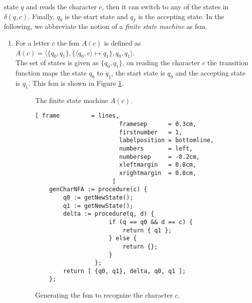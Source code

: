 state $q$ and reads the character $c$, then it can switch to any of the states in
$\delta(q,c)$.
Finally, $q_0$ is the start state and $q_f$ is the accepting state.  In the following, we
abbreviate the notion of a  
\emph{finite state machine} as fsm.
\begin{enumerate}
\item For a letter $c$ the fsm $A(c)$ is defined as
      \\[0.2cm]
      \hspace*{1.3cm}
      $A(c) = \langle \{ q_0, q_1 \}, 
                      \{ \langle q_0, c \rangle \mapsto q_1\}, q_0, q_1  \rangle$.
      \\[0.2cm]
      The set of states is given as $\{ q_0, q_1 \}$, on reading the character $c$ the
      transition function maps the state $q_0$ to $q_1$, the start state is $q_0$ and the
      accepting state is $q_1$.  This fsm is shown in Figure
      \ref{fig:aChar.eps}.

      \begin{figure}[!ht]
        \centering
      \caption{The finite state machine $A(c)$.}
      \label{fig:aChar.eps}
      \end{figure}

      \begin{figure}[!ht]
      \centering
      \begin{Verbatim}[ frame         = lines, 
                        framesep      = 0.3cm, 
                        firstnumber   = 1,
                        labelposition = bottomline,
                        numbers       = left,
                        numbersep     = -0.2cm,
                        xleftmargin   = 0.8cm,
                        xrightmargin  = 0.8cm,
                      ]
    genCharNFA := procedure(c) {
        q0 := getNewState();
        q1 := getNewState();
        delta := procedure(q, d) { 
                     if (q == q0 && d == c) { 
                         return { q1 };
                     } else { 
                         return {};
                     }
                 };
        return [ {q0, q1}, delta, q0, q1 ];
    };
      \end{Verbatim}
      \vspace*{-0.3cm}
      \caption{Generating the fsm to recognize the character $c$.}
      \label{fig:genCharNFA.stlx}
      \end{figure}


\end{enumerate}
